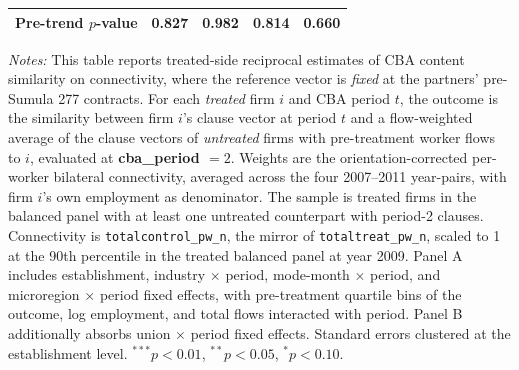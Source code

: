 \begin{table}[H]
\begin{tabular}{lcccc}
Pre-trend $p$-value & 0.827 & 0.982 & 0.814 & 0.660 \\
\bottomrule
\end{tabular}
\begin{minipage}{\linewidth}
\footnotesize\vspace{4pt}
\textit{Notes:} This table reports treated-side reciprocal estimates of CBA content similarity on connectivity, where the reference vector is \emph{fixed} at the partners' pre-Sumula 277 contracts. For each \emph{treated} firm $i$ and CBA period $t$, the outcome is the similarity between firm $i$'s clause vector at period $t$ and a flow-weighted average of the clause vectors of \emph{untreated} firms with pre-treatment worker flows to $i$, evaluated at \textbf{cba\_period $= 2$}. Weights are the orientation-corrected per-worker bilateral connectivity, averaged across the four 2007--2011 year-pairs, with firm $i$'s own employment as denominator. The sample is treated firms in the balanced panel with at least one untreated counterpart with period-2 clauses. Connectivity is \texttt{totalcontrol\_pw\_n}, the mirror of \texttt{totaltreat\_pw\_n}, scaled to 1 at the 90th percentile in the treated balanced panel at year 2009. Panel A includes establishment, industry $\times$ period, mode-month $\times$ period, and microregion $\times$ period fixed effects, with pre-treatment quartile bins of the outcome, log employment, and total flows interacted with period. Panel B additionally absorbs union $\times$ period fixed effects. Standard errors clustered at the establishment level. $^{***}p<0.01$, $^{**}p<0.05$, $^{*}p<0.10$.
\end{minipage}
\end{table}
